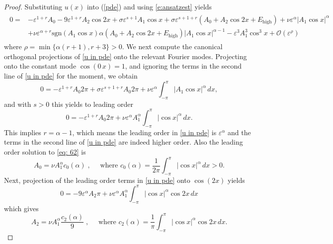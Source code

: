 \documentclass{article}
\numberwithin{equation}{section}
\def\eps{\varepsilon}
\def\calO{\mathcal{O}}
\begin{document}
\begin{proof}
		Substituting $u(x)$ into (\ref{pde}) and using \eqref{e:ansatzest} yields
		\begin{align}\label{u in pde}
			\begin{split}
				0 =& -\varepsilon^{1+r} A_0 - 9\varepsilon^{1+r} A_2 \cos 2x + \sigma \varepsilon^{s+1} A_1 \cos x 
				 + \sigma \varepsilon^{s+1+r} (A_0 + A_2 \cos 2x +E_{\mathrm{high}} ) + \nu \varepsilon^\alpha |A_1 \cos x|^\alpha \\
				& + \nu \varepsilon^{\alpha + r}\mathrm{sgn}( A_1 \cos x ) \alpha (A_0 + A_2 \cos 2x +E_{\mathrm{high}} ) |A_1 \cos x|^{\alpha-1} 
				 -\varepsilon^3 A_1^3 \cos^3x +  \calO(\eps^\rho) 
			\end{split}
		\end{align}
		where  
		$\rho = \min\{ \alpha(r+1), r+3 \}>0$. 
		We 
		next compute the canonical orthogonal projections of \eqref{u in pde} onto the relevant Fourier modes. 
		Projecting onto the constant mode $\cos(0 \, x)=1$,  
		and ignoring the terms in the second line of \eqref{u in pde} for the moment, we obtain
		\begin{equation}\label{eq: 62}
			0 = -\varepsilon^{1+r}A_0 2\pi + \sigma \varepsilon^{s+1+r}A_0 2 \pi + \nu \varepsilon^\alpha \int_{-\pi}^{\pi} |A_1\cos x|^\alpha \,dx, 
		\end{equation} 
		and with $s>0$ this yields to leading order 
		\begin{equation}
			0= -\varepsilon^{1+r}A_0 2\pi + \nu \varepsilon^\alpha A_1^\alpha \int_{-\pi}^{\pi} |\cos x|^\alpha \,dx. 
		\end{equation}
This implies $r=\alpha-1$, which means the leading order in \eqref{u in pde} is $\eps^\alpha$ and the terms in the second line of \eqref{u in pde} are indeed higher order. Also the leading order solution to \eqref{eq: 62} is
		\begin{equation} \label{eq: A0}
			A_0 = \nu A_1^\alpha c_0(\alpha) \;,\quad\text{ where } c_0(\alpha) = \frac{1}{2\pi} \int_{-\pi}^{\pi}|\cos x|^\alpha \,dx >0.
		\end{equation}
		Next, projection of the leading order terms in \eqref{u in pde} onto $\cos (2x)$ yields
		\begin{equation}
			0 = -9 \varepsilon^\alpha A_2 \pi + 
			 \nu \varepsilon^\alpha A_1^\alpha \int_{-\pi}^{\pi} |\cos x|^\alpha \cos 2x \,dx
		\end{equation}
		which gives 
		\begin{equation} \label{eq: A2}
			A_2 = \nu A_1^\alpha \frac{c_2(\alpha)}{9} \;,\quad\text{ where } c_2(\alpha) = \frac{1}{\pi} \int_{-\pi}^{\pi} |\cos x|^\alpha \cos 2x \,dx.

\end{equation}
\end{proof}
\end{document}
